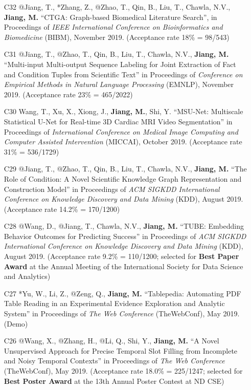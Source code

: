 \documentclass[10pt]{article}
\newenvironment{myindentpar}[1]%
{\begin{list}{}%
         {\setlength{\leftmargin}{#1}}%
         \item[]%
}
{\end{list}}
\newcounter{list}
\begin{document}
\begin{myindentpar}{0.00cm}
\begin{enumerate}[leftmargin=.5cm]
\item[C32] @Jiang, T., *Zhang, Z., @Zhao, T., Qin, B., Liu, T., Chawla, N.V., \textbf{Jiang, M.} ``CTGA: Graph-based Biomedical Literature Search'', in Proceedings of \textit{IEEE International Conference on Bioinformatics and Biomedicine} (BIBM), November 2019. (Acceptance rate 18\% = 98/543)

\item[C31] @Jiang, T., @Zhao, T., Qin, B., Liu, T., Chawla, N.V., \textbf{Jiang, M.} ``Multi-input Multi-output Sequence Labeling for Joint Extraction of Fact and Condition Tuples from Scientific Text'' in Proceedings of \textit{Conference on Empirical Methods in Natural Language Processing} (EMNLP), November 2019. (Acceptance rate 23\% = 465/2022)

\item[C30] Wang, T., Xu, X., Xiong, J., \textbf{Jiang, M.}, Shi, Y. ``MSU-Net: Multiscale Statistical U-Net for Real-time 3D Cardiac MRI Video Segmentation'' in Proceedings of \textit{International Conference on Medical Image Computing and Computer Assisted Intervention} (MICCAI), October 2019. (Acceptance rate 31\% = 536/1729)

\item[C29] @Jiang, T., @Zhao, T., Qin, B., Liu, T., Chawla, N.V., \textbf{Jiang, M.} ``The Role of Condition: A Novel Scientific Knowledge Graph Representation and Construction Model'' in Proceedings of \textit{ACM SIGKDD International Conference on Knowledge Discovery and Data Mining} (KDD), August 2019. (Acceptance rate 14.2\% = 170/1200)

\item[C28] @Wang, D., @Jiang, T., Chawla, N.V., \textbf{Jiang, M.} ``TUBE: Embedding Behavior Outcomes for Predicting Success'' in Proceedings of \textit{ACM SIGKDD International Conference on Knowledge Discovery and Data Mining} (KDD), August 2019. (Acceptance rate 9.2\% = 110/1200; selected for \textbf{Best Paper Award} at the Annual Meeting of the International Society for Data Science and Analytics)
	
\item[C27] *Yu, W., Li, Z., @Zeng, Q., \textbf{Jiang, M.} ``Tablepedia: Automating PDF Table Reading in an Experimental Evidence Exploration and Analytic System'' in Proceedings of \textit{The Web Conference} (TheWebConf), May 2019. (Demo)
	
\item[C26] @Wang, X., @Zhang, H., @Li, Q., Shi, Y., \textbf{Jiang, M.} ``A Novel Unsupervised Approach for Precise Temporal Slot Filling from Incomplete and Noisy Temporal Contexts'' in Proceedings of \textit{The Web Conference} (TheWebConf), May 2019. (Acceptance rate 18.0\% = 225/1247; selected for \textbf{Best Poster Award} at the 13th Annual Poster Contest at ND CSE)


\end{enumerate}
\end{myindentpar}
\end{document}
